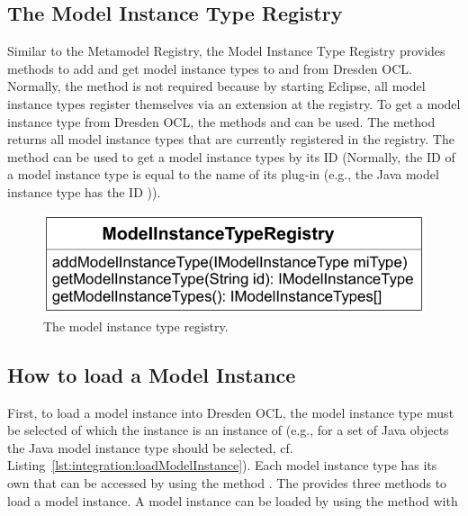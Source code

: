 \subsection{The Model Instance Type Registry}

Similar to the Metamodel Registry, the Model Instance Type Registry provides 
methods to add and get model instance types to and from Dresden OCL. Normally,
the method 
is not required because by starting Eclipse, all model instance types register
themselves via an extension at the registry. To get a model instance type from
Dresden OCL, the methods  and
 can be used. The method 
 returns all model instance types that are
currently registered in the registry. The method  can be used to get a model instance types by its ID (Normally, the ID 
of a model instance type is equal to the name of its plug-in (e.g., the Java 
model instance type has the ID 
)).

\begin{figure}[!b]
	\centering
	\includegraphics[width=.7\linewidth]{figures/integration/modelInstanceTypeRegistry}
	\caption{The model instance type registry.}
	\label{pic:integration:modelInstanceTypeRegistry}
\end{figure}


\subsection{How to load a Model Instance}

First, to load a model instance into Dresden OCL, the model instance type must be
selected of which the instance is an instance of (e.g., for a set of Java
objects the Java model instance type should be selected, cf. 
Listing~\ref{lst:integration:loadModelInstance}). Each model instance type has
its own  that can be accessed by using the
method . The 
 provides three methods to load a model instance. 
A model instance can be loaded by using the method  
with

